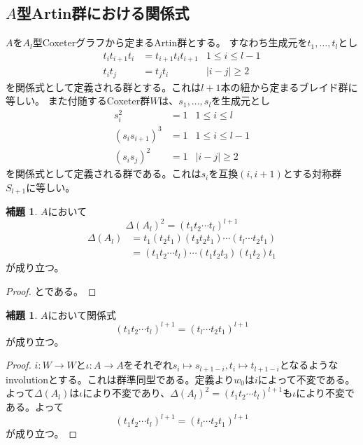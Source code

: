 \documentclass[uplatex, a4paper, dvipdfmx]{jsarticle}
\theoremstyle{definition}
\newtheorem{lemma}[theorem]{補題}
\begin{document}
\subsection{$A$型Artin群における関係式}
$A$を$A_l$型Coxeterグラフから定まるArtin群とする。
すなわち生成元を$t_1, \dots, t_l$とし
\begin{align}
    t_it_{i+1}t_i & = t_{i+1}t_it_{i+1} & 1\leq i \leq l-1 \\
    t_it_j        & = t_jt_i            & |i-j|\geq 2
\end{align}
を関係式として定義される群とする。これは$l+1$本の紐から定まるブレイド群に等しい。
また付随するCoxeter群$W$は、$s_1, \dots, s_l$を生成元とし
\begin{align}
    s_i^2          & = 1 & 1\leq i \leq l   \\
    (s_is_{i+1})^3 & = 1 & 1\leq i \leq l-1 \\
    (s_is_j)^2     & = 1 & |i-j|\geq 2
\end{align}
を関係式として定義される群である。これは$s_i$を互換$(i, i+1)$とする対称群$S_{l+1}$に等しい。
\begin{lemma}\label{relation_of_Delta}
    $A$において
    \begin{equation}
        \Delta(A_l)^2 = (t_1 t_2\cdots t_l)^{l+1}
    \end{equation}
    \begin{align}
        \Delta(A_l) & = t_1 (t_2t_1)(t_3t_2t_1)\cdots(t_l\cdots t_2t_1) \\
                    & =(t_1t_2\cdots t_l)\cdots(t_1t_2t_3)(t_1t_2)t_1
    \end{align}
    が成り立つ。
\end{lemma}
\begin{proof}
    \cite[Proposition 2.8]{MR1805936}と\cite[Lemma 3.1]{MR1475117}である。
\end{proof}
\begin{lemma}\label{involution_of_Delta}
    $A$において関係式
    \begin{equation}
        (t_1t_2\cdots t_l)^{l+1} = (t_l\cdots t_2t_1)^{l+1}
    \end{equation}
    が成り立つ。
\end{lemma}
\begin{proof}
    $i \colon W \to W$と$\iota \colon A \to A$をそれぞれ$s_i \mapsto s_{l+1-i}, t_i \mapsto t_{l+1-i}$となるようなinvolutionとする。これは群準同型である。定義より$w_0$は$i$によって不変である。よって$\Delta(A_l)$は$\iota$により不変であり、$\Delta(A_l)^2 = (t_1t_2\cdots t_l)^{l+1}$も$\iota$により不変である。よって\begin{equation}
        (t_1t_2\cdots t_l)^{l+1} = (t_l\cdots t_2t_1)^{l+1}
    \end{equation}
    が成り立つ。
\end{proof}
\end{document}
